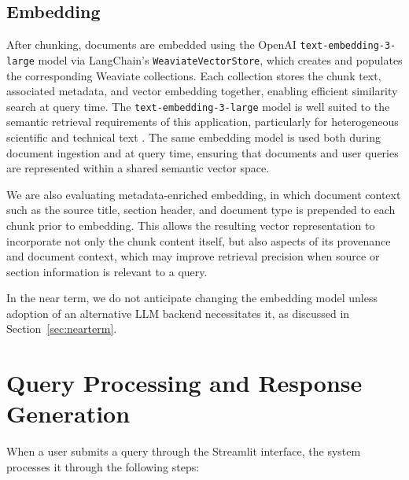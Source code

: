 \subsection{Embedding}
%
After chunking, documents are embedded using the OpenAI \texttt{text-embedding-3-large} model via LangChain's \texttt{WeaviateVectorStore}, which creates and populates the corresponding Weaviate collections. 
Each collection stores the chunk text, associated metadata, and vector embedding together, enabling efficient similarity search at query time.
The \texttt{text-embedding-3-large} model is well suited to the semantic retrieval requirements of this application, particularly for heterogeneous scientific and technical text \cite{openai2024embeddings}. 
The same embedding model is used both during document ingestion and at query time, ensuring that documents and user queries are represented within a shared semantic vector space.


We are also evaluating metadata-enriched embedding, in which document context such as the source title, section header, and document type is prepended to each chunk prior to embedding. 
This allows the resulting vector representation to incorporate not only the chunk content itself, but also aspects of its provenance and document context, which may improve retrieval precision when source or section information is relevant to a query.

In the near term, we do not anticipate changing the embedding model unless adoption of an alternative LLM backend necessitates it, as discussed in Section~\ref{sec:nearterm}.

\section{Query Processing and Response Generation}
\label{sec:query}

When a user submits a query through the Streamlit interface, the system processes it through the following steps:

